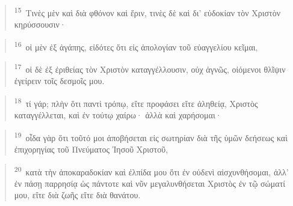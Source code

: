 \documentclass{article}
\newcommand{\currentverse}{1} %
\newcommand{\setcurrentverse}[1]{\renewcommand{\currentverse}{#1}}
\begin{document}
\begin{verse}

\setcurrentverse{15}

\setcounter{footnote}{0}

\textsuperscript{15}~Τινὲς μὲν καὶ διὰ φθόνον καὶ ἔριν, τινὲς δὲ καὶ δι’ εὐδοκίαν τὸν Χριστὸν κηρύσσουσιν·

\end{verse}

\begin{verse}

\setcurrentverse{16}

\setcounter{footnote}{0}

\textsuperscript{16}~οἱ μὲν ἐξ ἀγάπης, εἰδότες ὅτι εἰς ἀπολογίαν τοῦ εὐαγγελίου κεῖμαι,

\end{verse}

\begin{verse}

\setcurrentverse{17}

\setcounter{footnote}{0}

\textsuperscript{17}~οἱ δὲ ἐξ ἐριθείας τὸν Χριστὸν καταγγέλλουσιν, οὐχ ἁγνῶς, οἰόμενοι θλῖψιν ἐγείρειν τοῖς δεσμοῖς μου.

\end{verse}

\begin{verse}

\setcurrentverse{18}

\setcounter{footnote}{0}

\textsuperscript{18}~τί γάρ; πλὴν ὅτι παντὶ τρόπῳ, εἴτε προφάσει εἴτε ἀληθείᾳ, Χριστὸς καταγγέλλεται, καὶ ἐν τούτῳ χαίρω· ἀλλὰ καὶ χαρήσομαι·

\end{verse}

\begin{verse}

\setcurrentverse{19}

\setcounter{footnote}{0}

\textsuperscript{19}~οἶδα γὰρ ὅτι τοῦτό μοι ἀποβήσεται εἰς σωτηρίαν διὰ τῆς ὑμῶν δεήσεως καὶ ἐπιχορηγίας τοῦ Πνεύματος Ἰησοῦ Χριστοῦ,

\end{verse}

\begin{verse}

\setcurrentverse{20}

\setcounter{footnote}{0}

\textsuperscript{20}~κατὰ τὴν ἀποκαραδοκίαν καὶ ἐλπίδα μου ὅτι ἐν οὐδενὶ αἰσχυνθήσομαι, ἀλλ’ ἐν πάσῃ παρρησίᾳ ὡς πάντοτε καὶ νῦν μεγαλυνθήσεται Χριστὸς ἐν τῷ σώματί μου, εἴτε διὰ ζωῆς εἴτε διὰ θανάτου.

\end{verse}
\end{document}
